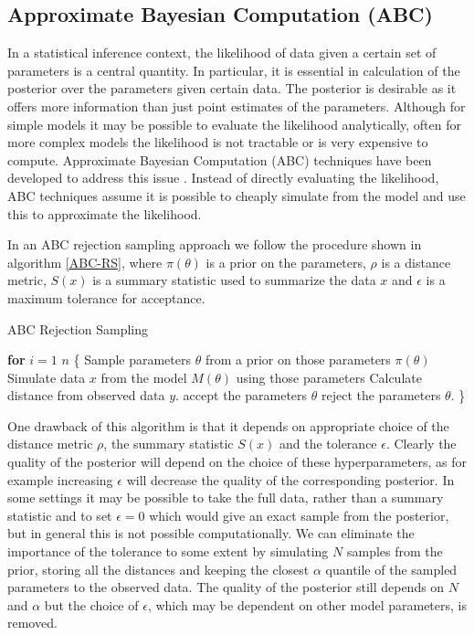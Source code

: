 \documentclass[twocolumn]{biophys}
\begin{document}
\subsection{Approximate Bayesian Computation (ABC)}
In a statistical inference context, the likelihood of data given a certain set of parameters is a central quantity. 
In particular, it is essential in calculation of the posterior over the parameters given certain data. 
The posterior is desirable as it offers more information than just point estimates of the parameters.
Although for simple models it may be possible to evaluate the likelihood analytically, often for more complex models the likelihood is not tractable or is very expensive to compute.  
Approximate Bayesian Computation (ABC) techniques have been developed to address this issue \cite{beaumont2002approximate}.
Instead of directly evaluating the likelihood, ABC techniques assume it is possible to cheaply simulate from the model and use this to approximate the likelihood.

In an ABC rejection sampling approach we follow the procedure shown in algorithm \ref{ABC-RS}, where $\pi(\theta)$ is a prior on the parameters, $\rho$ is a distance metric, $S(x)$ is a summary statistic used to summarize the data $x$ and $\epsilon$ is a maximum tolerance for acceptance. 
\begin{algorithm}
\caption{ABC Rejection Sampling}\label{ABC-RS}
\begin{algorithmic}[1]
\State \textbf{for} $i=1$  $n$  \{
\State Sample parameters $\theta$ from a prior on those parameters $\pi (\theta)$ 
\State Simulate data $x$ from the model $M(\theta)$ using those parameters 
\State Calculate distance from observed data $y$.
 accept the parameters $\theta$
\Else \hspace{2pt} reject the parameters $\theta$.
\EndIf
\State \}
\end{algorithmic}
\end{algorithm}

One drawback of this algorithm is that it depends on appropriate choice of the distance metric $\rho$, the summary statistic $S(x)$ and the tolerance $\epsilon $. 
Clearly the quality of the posterior will depend on the choice of these hyperparameters, as for example increasing $\epsilon $ will decrease the quality of the corresponding posterior.
In some settings it may be possible to take the full data, rather than a summary statistic and to set $\epsilon=0$ which would give an exact sample from the posterior, but in general this is not possible computationally. 
We can eliminate the importance of the tolerance to some extent by simulating $N$ samples from the prior, storing all the distances and keeping the closest $\alpha$ quantile of the sampled parameters to the observed data. 
The quality of the posterior still depends on $N$ and $\alpha$ but the choice of $\epsilon $, which may be dependent on other model parameters, is removed. 
\end{document}
